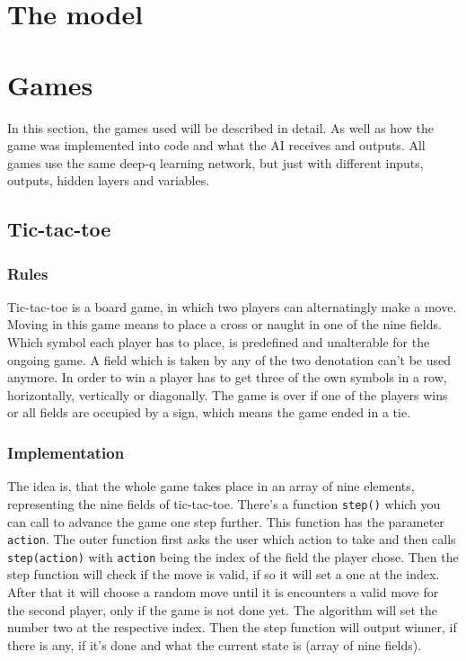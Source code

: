 \documentclass[12pt]{article}
\begin{document}
\section{The model}\label{sec:TheModel}
\section{Games}
In this section, the games used will be described in detail. As well as how the game was implemented into code and what the AI receives and outputs. All games use the same deep-q learning network, but just with different inputs, outputs, hidden layers and variables.
\subsection{Tic-tac-toe}
\subsubsection{Rules}
Tic-tac-toe is a board game, in which two players can alternatingly make a move. Moving in this game means to place a cross or naught in one of the nine fields. Which symbol each player has to place, is predefined and unalterable for the ongoing game. A field which is taken by any of the two denotation can't be used anymore. In order to win a player has to get three of the own symbols in a row, horizontally, vertically or diagonally. The game is over if one of the players wins or all fields are occupied by a sign, which means the game ended in a tie.
\subsubsection{Implementation}
The idea is, that the whole game takes place in an array of nine elements, representing the nine fields of tic-tac-toe. There's a function \lstinline{step()} which you can call to advance the game one step further. This function has the parameter \lstinline{action}. The outer function first asks the user which action to take and then calls \lstinline{step(action)} with \lstinline{action} being the index of the field the player chose. Then the step function will check if the move is valid, if so it will set a one at the index. After that it will choose a random move until it is encounters a valid move for the second player, only if the game is not done yet. The algorithm will set the number two at the respective index. Then the step function will output winner, if there is any, if it's done and what the current state is (array of nine fields).
\end{document}
